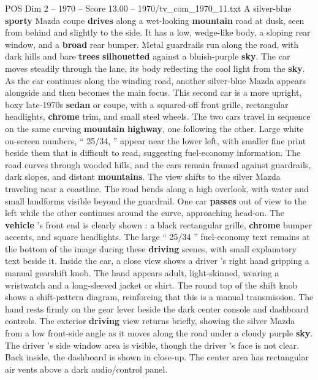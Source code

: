 \begin{textsample}{POS Dim 2 – 1970 – Score 13.00 – 1970/tv\_com\_1970\_11.txt}  \label{ex:f2_pos_077}
A silver-blue \textbf{sporty} Mazda coupe \textbf{drives} along a wet-looking \textbf{mountain} road at dusk, seen from behind and slightly to the side.
It has a low, wedge-like body, a sloping rear window, and a \textbf{broad} rear bumper.
Metal guardrails run along the road, with dark hills and bare \textbf{trees} \textbf{silhouetted} against a bluish-purple \textbf{sky}.
The car moves steadily through the lane, its body reflecting the cool light from the \textbf{sky}.
As the car continues along the winding road, another silver-blue Mazda appears alongside and then becomes the main focus.
This second car is a more upright, boxy late-1970s \textbf{sedan} or coupe, with a squared-off front grille, rectangular headlights, \textbf{chrome} trim, and small steel wheels.
The two cars travel in sequence on the same curving \textbf{mountain} \textbf{highway}, one following the other.
Large white on-screen numbers, “ 25/34, ” appear near the lower left, with smaller fine print beside them that is difficult to read, suggesting fuel-economy information.
The road curves through wooded hills, and the cars remain framed against guardrails, dark slopes, and distant \textbf{mountains}.
The view shifts to the silver Mazda traveling near a coastline.
The road bends along a high overlook, with water and small landforms visible beyond the guardrail.
One car \textbf{passes} out of view to the left while the other continues around the curve, approaching head-on.
The \textbf{vehicle} ’s front end is clearly shown : a black rectangular grille, \textbf{chrome} bumper accents, and square headlights.
The large “ 25/34 ” fuel-economy text remains at the bottom of the image during these \textbf{driving} scenes, with small explanatory text beside it.
Inside the car, a close view shows a driver ’s right hand gripping a manual gearshift knob.
The hand appears adult, light-skinned, wearing a wristwatch and a long-sleeved jacket or shirt.
The round top of the shift knob shows a shift-pattern diagram, reinforcing that this is a manual transmission.
The hand rests firmly on the gear lever beside the dark center console and dashboard controls.
The exterior \textbf{driving} view returns briefly, showing the silver Mazda from a low front-side angle as it moves along the road under a cloudy purple \textbf{sky}.
The driver ’s side window area is visible, though the driver ’s face is not clear.
Back inside, the dashboard is shown in close-up.
The center area has rectangular air vents above a dark audio/control panel.

\end{textsample}
